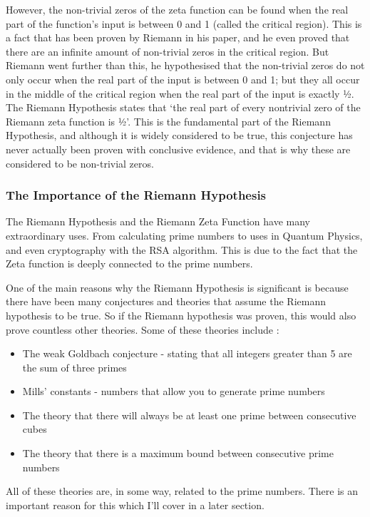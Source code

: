 \documentclass[12pt]{article}
\begin{document}
However, the non-trivial zeros of the zeta function can be found when the real part of the function’s input is between 0 and 1 (called the critical region). This is a fact that has been proven by Riemann in his paper, and he even proved that there are an infinite amount of non-trivial zeros in the critical region. But Riemann went further than this, he hypothesised that the non-trivial zeros do not only occur when the real part of the input is between 0 and 1; but they all occur in the middle of the critical region when the real part of the input is exactly ½. The Riemann Hypothesis states that ‘the real part of every nontrivial zero of the Riemann zeta function is ½’. This is the fundamental part of the Riemann Hypothesis, and although it is widely considered to be true, this conjecture has never actually been proven with conclusive evidence, and that is why these are considered to be non-trivial zeros.


\subsubsection{The Importance of the Riemann Hypothesis}
The Riemann Hypothesis and the  Riemann Zeta Function have many extraordinary uses. From calculating prime numbers to uses in Quantum Physics, and even cryptography with the RSA algorithm. This is due to the fact that the Zeta function is deeply connected to the prime numbers.

One of the main reasons why the Riemann Hypothesis is significant is because there have been many conjectures and theories that assume the Riemann hypothesis to be true. So if the Riemann hypothesis was proven, this would also prove countless other theories.
Some of these theories include :
\begin{itemize}
    \item The weak Goldbach conjecture - stating that all integers greater than 5 are the sum of three primes
    \item Mills’ constants - numbers that allow you to generate prime numbers
    \item The theory that there will always be at least one prime between consecutive cubes
    \item The theory that there is a maximum bound between consecutive prime numbers
\end{itemize}
All of these theories are, in some way, related to the prime numbers. There is an important reason for this which I’ll cover in a later section.
\end{document}
